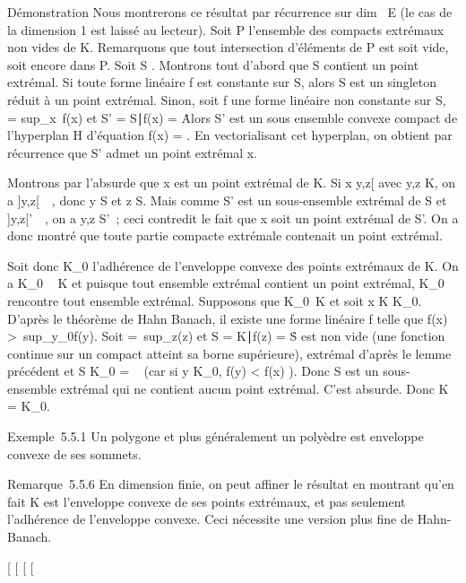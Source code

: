 \documentclass[]{article}
\begin{document}
Démonstration Nous montrerons ce résultat par récurrence sur
dim~ E (le cas de la dimension 1 est laissé au
lecteur). Soit P l'ensemble des compacts extrémaux non vides de K.
Remarquons que tout intersection d'éléments de P est soit vide, soit
encore dans P. Soit S \inP. Montrons tout d'abord que S contient un point
extrémal. Si toute forme linéaire f est constante sur S, alors S est un
singleton réduit à un point extrémal. Sinon, soit f une forme linéaire
non constante sur S, \mu = sup_x\inS~f(x)
et S' = \x \in S∣f(x) =
\mu\. Alors S' est un sous ensemble convexe compact de
l'hyperplan H d'équation f(x) = \mu. En vectorialisant cet hyperplan, on
obtient par récurrence que S' admet un point extrémal x.

Montrons par l'absurde que x est un point extrémal de K. Si x \in{]}y,z{[}
avec y,z \in K, on a {]}y,z{[}\bigcapS\neq~\varnothing~, donc y \in S
et z \in S. Mais comme S' est un sous-ensemble extrémal de S et
{]}y,z{[}\bigcapS'\neq~\varnothing~, on a y,z \in S'~; ceci
contredit le fait que x soit un point extrémal de S'. On a donc montré
que toute partie compacte extrémale contenait un point extrémal.

Soit donc K_0 l'adhérence de l'enveloppe convexe des points
extrémaux de K. On a K_0 \subset~ K et puisque tout ensemble extrémal
contient un point extrémal, K_0 rencontre tout ensemble
extrémal. Supposons que K_0\neq~K et
soit x \in K \diagdown K_0. D'après le théorème de Hahn Banach, il existe
une forme linéaire f telle que f(x)
\textgreater{}\
sup_y\inK_0f(y). Soit \mu =\
sup_z\inKf(z) et S = \z \in
K∣f(z) = \mu\. S est non vide
(une fonction continue sur un compact atteint sa borne supérieure),
extrémal d'après le lemme précédent et S \bigcap K_0 = \varnothing~ (car si y \in
K_0, f(y) \textless{} f(x) \leq \mu). Donc S est un sous-ensemble
extrémal qui ne contient aucun point extrémal. C'est absurde. Donc K =
K_0.

Exemple~5.5.1 Un polygone et plus généralement un polyèdre est enveloppe
convexe de ses sommets.

Remarque~5.5.6 En dimension finie, on peut affiner le résultat en
montrant qu'en fait K est l'enveloppe convexe de ses points extrémaux,
et pas seulement l'adhérence de l'enveloppe convexe. Ceci nécessite une
version plus fine de Hahn-Banach.

{[}
{[}
{[}
{[}
\end{document}
